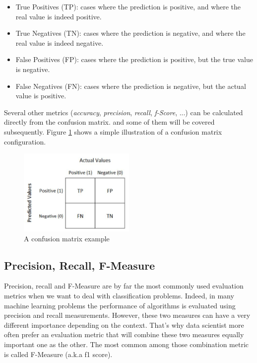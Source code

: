 \documentclass[LaM,binding=0.6cm, english]{sapthesis}
\begin{document}
\begin{itemize}
	\item True Positives (TP): cases where the prediction is positive, and where the real value is indeed positive.
  	\item True Negatives (TN): cases where the prediction is negative, and where the real value is indeed negative.
  	\item False Positives (FP): cases where the prediction is positive, but the true value is negative.
  	\item False Negatives (FN): cases where the prediction is negative, but the actual value is positive.
\end{itemize}

\par Several other metrics (\textit{accuracy}, \textit{precision}, \textit{recall}, \textit{f-Score}, ...) can be calculated directly from the confusion matrix. and some of them will be covered subsequently. Figure \ref{fig:confusion-matrix} shows a simple illustration of a confusion matrix configuration.

\begin{figure}[h!]
    \includegraphics[width=0.5\textwidth]{images/confusion-matrix-exemple.jpg}
    \centering
    \caption{A confusion matrix example}
    \label{fig:confusion-matrix}
\end{figure}

\subsection{Precision, Recall, F-Measure}

Precision, recall and F-Measure are by far the most commonly used evaluation metrics when we want to deal with classification problems. Indeed, in many machine learning problems the performance of algorithms is evaluated using precision and recall measurements.\cite{Sokolova2006} However, these two measures can have a very different importance depending on the
context. That's why data scientist more often prefer an evaluation metric that will combine these two measures equally important one as the other. The most common among those combination metric is called F-Measure (a.k.a f1 score).\cite{Albatineh2011}
\end{document}
